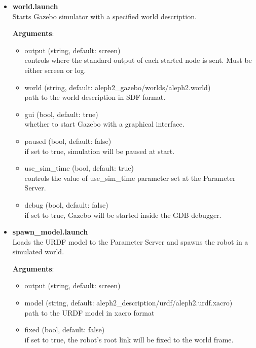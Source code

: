 \documentclass[english,inz,shortabstract]{iithesis}
\newcommand{\val}[1]{\textbf{\textsf{#1}}}
\begin{document}
	\begin{itemize}
		\item \val{world.launch}\\
		Starts Gazebo simulator with a specified world description.

		\textbf{Arguments}:
		\begin{itemize}[itemsep=0pt, parsep=2pt, topsep=0pt]
			\item \textsf{output} (\textsf{string}, default: \textsf{screen})\\
			controls where the standard output of each started node is sent. Must be either \textsf{screen} or \textsf{log}.
			\item \textsf{world} (\textsf{string}, default: \textsf{aleph2\_gazebo/worlds/aleph2.world})\\
			path to the world description in SDF format.
			\item \textsf{gui} (\textsf{bool}, default: \textsf{true})\\
			whether to start Gazebo with a graphical interface.
			\item \textsf{paused} (\textsf{bool}, default: \textsf{false})\\
			if set to \textsf{true}, simulation will be paused at start.
			\item \textsf{use\_sim\_time} (\textsf{bool}, default: \textsf{true})\\
			controls the value of \textsf{use\_sim\_time} parameter set at the Parameter Server.
			\item \textsf{debug} (\textsf{bool}, default: \textsf{false})\\
			if set to \textsf{true}, Gazebo will be started inside the GDB debugger.
		\end{itemize}

		\item \val{spawn\_model.launch}\\
		Loads the URDF model to the Parameter Server and spawns the robot in a simulated world.

		\textbf{Arguments}:
		\begin{itemize}[itemsep=0pt, parsep=2pt, topsep=0pt]
			\item \textsf{output} (\textsf{string}, default: \textsf{screen})
			\item \textsf{model} (\textsf{string}, default: \textsf{aleph2\_description/urdf/aleph2.urdf.xacro})\\
			path to the URDF model in xacro format
			\item \textsf{fixed} (\textsf{bool}, default: \textsf{false})\\
			if set to \textsf{true}, the robot's root link will be fixed to the world frame.
		\end{itemize}


\end{itemize}
\end{document}
